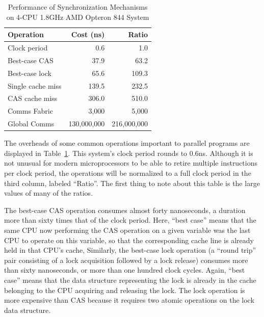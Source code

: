 \begin{table}
\centering
\begin{tabular}{l||r|r}
	Operation		& Cost (ns) 	& Ratio \\
	\hline
	\hline
	Clock period		&           0.6	&           1.0 \\
	\hline
	Best-case CAS		&          37.9	&          63.2 \\
	\hline
	Best-case lock		&          65.6	&         109.3\\
	\hline
	Single cache miss	&         139.5	&         232.5 \\
	\hline
	CAS cache miss		&         306.0	&         510.0 \\
	\hline
	Comms Fabric		&       3,000	&       5,000 \\
	\hline
	Global Comms		& 130,000,000	& 216,000,000 \\
\end{tabular}
\caption{Performance of Synchronization Mechanisms on 4-CPU 1.8GHz AMD Opteron 844 System}
\label{tab:cpu:Performance of Synchronization Mechanisms on 4-CPU 1.8GHz AMD Opteron 844 System}
\end{table}

The overheads of some common operations important to parallel programs are
displayed in
Table~\ref{tab:cpu:Performance of Synchronization Mechanisms on 4-CPU 1.8GHz AMD Opteron 844 System}.
This system's clock period rounds to 0.6ns.
Although it is not unusual for modern microprocessors to be able to retire
multiple instructions per clock period, the operations will be normalized
to a full clock period in the third column, labeled ``Ratio''.
The first thing to note about this table is the large values of many of
the ratios.

The best-case CAS operation consumes almost forty
nanoseconds, a duration more than sixty times that of the clock period.
Here, ``best case'' means that the same CPU now performing the CAS operation
on a given variable was the last CPU to operate on this variable, so
that the corresponding cache line is already held in that CPU's cache,
Similarly, the best-case lock operation (a ``round trip'' pair consisting
of a lock acquisition followed by a lock release) consumes more than
sixty nanoseconds, or more than one hundred clock cycles.
Again, ``best case'' means that the data structure representing the
lock is already in the cache belonging to the CPU acquiring and releasing
the lock.
The lock operation is more expensive than CAS because it requires two
atomic operations on the lock data structure.

